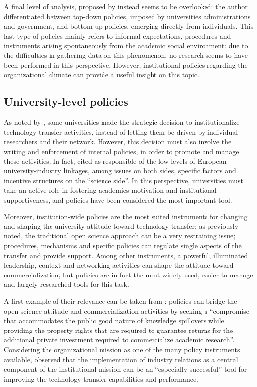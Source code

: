 A final level of analysis, proposed by \citet{Rasmussen2006} instead seems to be overlooked: the author differentiated between top-down policies, imposed by universities administrations and government, and bottom-up policies, emerging directly from individuals. This last type of policies mainly refers to informal expectations, procedures and instruments arising spontaneously from the academic social environment: due to the difficulties in gathering data on this phenomenon, no research seems to have been performed in this perspective. However, institutional policies regarding the organizational climate can provide a useful insight on this topic.

\subsection{University-level policies}

As noted by \citet{Geuna2009}, some universities made the strategic decision to institutionalize technology transfer activities, instead of letting them be driven by individual researchers and their network. However, this decision must also involve the writing and enforcement of internal policies, in order to promote and manage these activities. In fact, \citet{Debackere2005} cited as responsible of the low levels of European university-industry linkages, among issues on both sides, specific factors and incentive structures on the \enquote{science side}. In this perspective, universities must take an active role in fostering academics motivation and institutional supportiveness, and policies have been considered the most important tool.

Moreover, institution-wide policies are the most suited instruments for changing and shaping the university attitude toward technology transfer: as previously noted, the traditional open science approach can be a very restraining issue; procedures, mechanisms and specific policies can regulate single aspects of the transfer and  provide support. Among other instruments, a powerful, illuminated leadership, context and networking activities can shape the attitude toward commercialization, but policies are in fact the most widely used, easier to manage and largely researched tools for this task. 

A first example of their relevance can be taken from \citet{Bercovitz2006}: policies can bridge the open science attitude and commercialization activities by seeking a \enquote{compromise that accommodates the public good nature of knowledge spillovers while providing the property rights that are required to guarantee returns for the additional private investment required to commercialize academic research}.  Considering the organizational mission as one of the many policy instruments available, \citet{Debackere2005} observed that the implementation of industry relations as a central component of the institutional mission can be an \enquote{especially successful} tool for improving the technology transfer capabilities and performance. 

